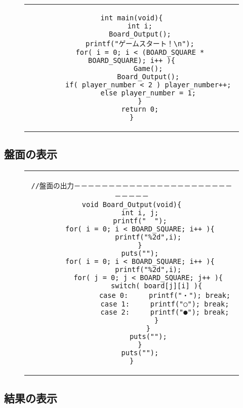 \documentclass[uplatex,a4paper,11pt,oneside,openany]{jsbook}
\begin{document}
\begin{figure}[H]
  \centering
    \begin{tabular}{c}
\begin{minipage}{1.0\hsize}
  \centering
\begin{lstlisting}[caption=主処理：連珠（五目並べ）,label=prog8]
int main(void){
    int i;
    Board_Output();
    printf("ゲームスタート！\n");
    for( i = 0; i < (BOARD_SQUARE * BOARD_SQUARE); i++ ){
        Game();
        Board_Output();
        if( player_number < 2 ) player_number++;
        else player_number = 1;
    }
    return 0;
}
\end{lstlisting}
\end{minipage}
\end{tabular}
\end{figure}

\subsection{盤面の表示}

\begin{figure}[H]
  \centering
    \begin{tabular}{c}
\begin{minipage}{1.0\hsize}
  \centering
\begin{lstlisting}[caption=盤面の出力：連珠（五目並べ）,label=prog8]
//盤面の出力－－－－－－－－－－－－－－－－－－－－－－－－－－－－
void Board_Output(void){
    int i, j;
    printf("  ");
    for( i = 0; i < BOARD_SQUARE; i++ ){
        printf("%2d",i);
    }
    puts("");
    for( i = 0; i < BOARD_SQUARE; i++ ){
        printf("%2d",i);
        for( j = 0; j < BOARD_SQUARE; j++ ){
            switch( board[j][i] ){
                case 0:     printf("・"); break;
                case 1:     printf("○"); break;
                case 2:     printf("●"); break;
            }
        }
        puts("");
    }
    puts("");
}
\end{lstlisting}
\end{minipage}
\end{tabular}
\end{figure}

\subsection{結果の表示}
\end{document}
